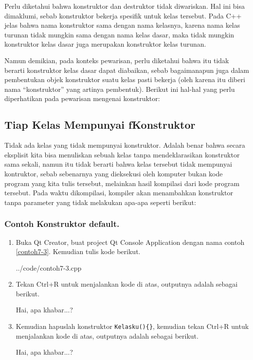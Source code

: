 Perlu diketahui bahwa konstruktor dan destruktor tidak diwariskan. Hal
ini bisa dimaklumi, sebab konstruktor bekerja spesifik untuk kelas
tersebut. Pada C++ jelas bahwa nama konstruktor sama dengan nama
kelasnya, karena nama kelas turunan tidak mungkin sama dengan nama kelas
dasar, maka tidak mungkin konstruktor kelas dasar juga merupakan
konstruktor kelas turunan.

Namun demikian, pada konteks pewarisan, perlu diketahui bahwa itu tidak
berarti konstruktor kelas dasar dapat diabaikan, sebab bagaimanapun juga
dalam pembentukan objek konstruktor suatu kelas pasti bekerja (oleh
karena itu diberi nama ``konstruktor'' yang artinya pembentuk). Berikut
ini hal-hal yang perlu diperhatikan pada pewarisan mengenai konstruktor:

\subsection{Tiap Kelas Mempunyai fKonstruktor}\label{tiap-kelas-mempunyai-konstruktor}

Tidak ada kelas yang tidak mempunyai konstruktor. Adalah benar bahwa
secara eksplisit kita bisa menuliskan sebuah kelas tanpa mendeklarasikan
konstruktor sama sekali, namun itu tidak berarti bahwa kelas tersebut
tidak mempunyai kontruktor, sebab sebenarnya yang dieksekusi oleh
komputer bukan kode program yang kita tulis tersebut, melainkan hasil
kompilasi dari kode program tersebut. Pada waktu dikompilasi, kompiler
akan menambahkan konstruktor tanpa parameter yang tidak melakukan
apa-apa seperti berikut:



\subsubsection*{Contoh Konstruktor default.}

\begin{enumerate}

\item
 Buka Qt Creator, buat project Qt Console Application dengan nama
 contoh \ref{contoh7-3}. Kemudian tulis kode berikut.


{../code/contoh7-3.cpp}

\item
 Tekan Ctrl+R untuk menjalankan kode di atas, outputnya adalah sebagai
 berikut.

\begin{lcverbatim}
Hai, apa khabar...?
\end{lcverbatim}



\item
 Kemudian hapuslah konstruktor \texttt{Kelasku()\{\}}, kemudian tekan
 Ctrl+R untuk menjalankan kode di atas, outputnya adalah sebagai
 berikut.
 \begin{lcverbatim}
Hai, apa khabar...?
 \end{lcverbatim}
\end{enumerate}



